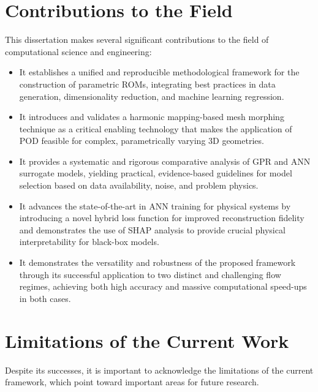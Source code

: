 \documentclass[dsc, EN]{ufabcFHZh}
\begin{document}
\section{Contributions to the Field}

This dissertation makes several significant contributions to the field of computational science and engineering:

\begin{itemize}
    \item It establishes a unified and reproducible methodological framework for the construction of parametric ROMs, integrating best practices in data generation, dimensionality reduction, and machine learning regression.
    \item It introduces and validates a harmonic mapping-based mesh morphing technique as a critical enabling technology that makes the application of POD feasible for complex, parametrically varying 3D geometries.
    \item It provides a systematic and rigorous comparative analysis of GPR and ANN surrogate models, yielding practical, evidence-based guidelines for model selection based on data availability, noise, and problem physics.
    \item It advances the state-of-the-art in ANN training for physical systems by introducing a novel hybrid loss function for improved reconstruction fidelity and demonstrates the use of SHAP analysis to provide crucial physical interpretability for black-box models.
    \item It demonstrates the versatility and robustness of the proposed framework through its successful application to two distinct and challenging flow regimes, achieving both high accuracy and massive computational speed-ups in both cases.
\end{itemize}


\section{Limitations of the Current Work}

Despite its successes, it is important to acknowledge the limitations of the current framework, which point toward important areas for future research.
\end{document}
